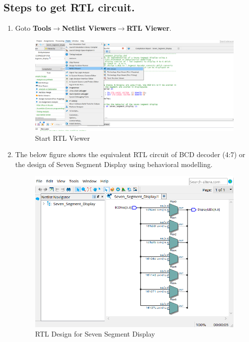 \documentclass[12pt,singleside,a4paper]{article}
\begin{document}
    \subsection*{Steps to get RTL circuit.}
    \vspace{4mm}
        
    \begin{enumerate}
            
        \item Goto \textbf{Tools}$\rightarrow$\textbf{Netlist Viewers}$\rightarrow$\textbf{RTL Viewer}.
        \vspace{6mm}
        \begin{figure}[H]
        \centering
        \includegraphics[width=14cm,keepaspectratio]{Project/Create6.png}
        \caption{Start RTL Viewer}
        \end{figure}
  \newpage      
        \item The below figure shows the equivalent RTL circuit of BCD decoder (4:7) or the design of Seven Segment Display using behavioral modelling.  \begin{figure}[H]
        \centering
        \includegraphics[width=12cm,keepaspectratio]{Project/Create7.png}
        \caption{RTL Design for Seven Segment Display}
        \end{figure}
    \end{enumerate}
\end{document}
